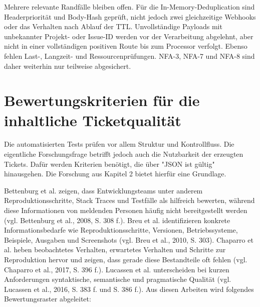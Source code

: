 Mehrere relevante Randfälle bleiben offen. Für die In-Memory-Deduplication sind Headerpriorität und Body-Hash geprüft, nicht jedoch zwei gleichzeitige Webhooks oder das Verhalten nach Ablauf der TTL. Unvollständige Payloads mit unbekannter Projekt- oder Issue-ID werden vor der Verarbeitung abgelehnt, aber nicht in einer vollständigen positiven Route bis zum Processor verfolgt. Ebenso fehlen Last-, Langzeit- und Ressourcenprüfungen. NFA-3, NFA-7 und NFA-8 sind daher weiterhin nur teilweise abgesichert.

\section{Bewertungskriterien für die inhaltliche Ticketqualität}

Die automatisierten Tests prüfen vor allem Struktur und Kontrollfluss. Die eigentliche Forschungsfrage betrifft jedoch auch die Nutzbarkeit der erzeugten Tickets. Dafür werden Kriterien benötigt, die über "JSON ist gültig" hinausgehen. Die Forschung aus Kapitel 2 bietet hierfür eine Grundlage.

Bettenburg et al. zeigen, dass Entwicklungsteams unter anderem Reproduktionsschritte, Stack Traces und Testfälle als hilfreich bewerten, während diese Informationen von meldenden Personen häufig nicht bereitgestellt werden (vgl. Bettenburg et al., 2008, S. 308 f.). Breu et al. identifizieren konkrete Informationsbedarfe wie Reproduktionsschritte, Versionen, Betriebssysteme, Beispiele, Ausgaben und Screenshots (vgl. Breu et al., 2010, S. 303). Chaparro et al. heben beobachtetes Verhalten, erwartetes Verhalten und Schritte zur Reproduktion hervor und zeigen, dass gerade diese Bestandteile oft fehlen (vgl. Chaparro et al., 2017, S. 396 f.). Lucassen et al. unterscheiden bei kurzen Anforderungen syntaktische, semantische und pragmatische Qualität (vgl. Lucassen et al., 2016, S. 383 f. und S. 386 f.). Aus diesen Arbeiten wird folgendes Bewertungsraster abgeleitet:

